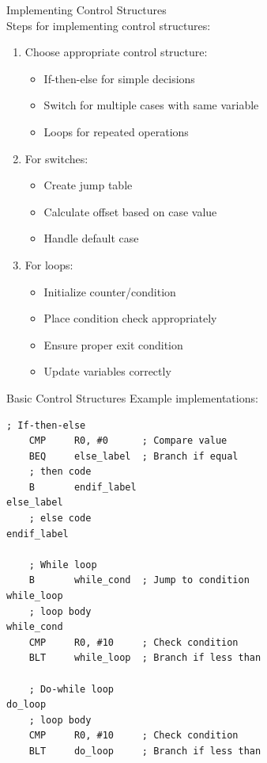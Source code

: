 \begin{KR}{Implementing Control Structures}\\
Steps for implementing control structures:
\begin{enumerate}
  \item Choose appropriate control structure:
    \begin{itemize}
      \item If-then-else for simple decisions
      \item Switch for multiple cases with same variable
      \item Loops for repeated operations
    \end{itemize}
  \item For switches:
    \begin{itemize}
      \item Create jump table
      \item Calculate offset based on case value
      \item Handle default case
    \end{itemize}
  \item For loops:
    \begin{itemize}
      \item Initialize counter/condition
      \item Place condition check appropriately
      \item Ensure proper exit condition
      \item Update variables correctly
    \end{itemize}
\end{enumerate}
\end{KR}

\begin{example2}{Basic Control Structures}
Example implementations:
\begin{lstlisting}[language=armasm, style=basesmol]
    ; If-then-else
    CMP     R0, #0      ; Compare value
    BEQ     else_label  ; Branch if equal
    ; then code
    B       endif_label
else_label
    ; else code
endif_label

    ; While loop
    B       while_cond  ; Jump to condition
while_loop
    ; loop body
while_cond
    CMP     R0, #10     ; Check condition
    BLT     while_loop  ; Branch if less than

    ; Do-while loop
do_loop
    ; loop body
    CMP     R0, #10     ; Check condition
    BLT     do_loop     ; Branch if less than
\end{lstlisting}
\end{example2}

